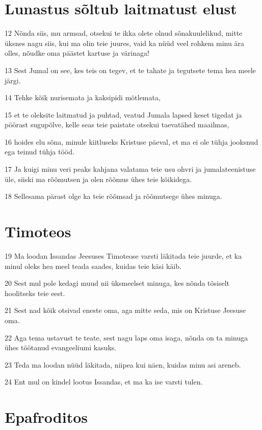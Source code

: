\section*{Lunastus sõltub laitmatust elust}

\par 12 Nõnda siis, mu armsad, otsekui te ikka olete olnud sõnakuulelikud, mitte üksnes nagu siis, kui ma olin teie juures, vaid ka nüüd veel rohkem minu ära olles, nõudke oma päästet kartuse ja värinaga!
\par 13 Sest Jumal on see, kes teis on tegev, et te tahate ja tegutsete tema hea meele järgi.
\par 14 Tehke kõik nurisemata ja kaksipidi mõtlemata,
\par 15 et te oleksite laitmatud ja puhtad, veatud Jumala lapsed keset tigedat ja pöörast sugupõlve, kelle seas teie paistate otsekui taevatähed maailmas,
\par 16 hoides elu sõna, minule kiitluseks Kristuse päeval, et ma ei ole tühja jooksnud ega teinud tühja tööd.
\par 17 Ja kuigi minu veri peaks kahjana valatama teie usu ohvri ja jumalateenistuse üle, siiski ma rõõmutsen ja olen rõõmus ühes teie kõikidega.
\par 18 Sellesama pärast olge ka teie rõõmsad ja rõõmutsege ühes minuga.

\section*{Timoteos}

\par 19 Ma loodan Issandas Jeesuses Timoteose varsti läkitada teie juurde, et ka minul oleks hea meel teada saades, kuidas teie käsi käib.
\par 20 Sest mul pole kedagi muud nii üksmeelset minuga, kes nõnda tõsiselt hoolitseks teie eest.
\par 21 Sest nad kõik otsivad eneste oma, aga mitte seda, mis on Kristuse Jeesuse oma.
\par 22 Aga tema ustavust te teate, sest nagu laps oma isaga, nõnda on ta minuga ühes töötanud evangeeliumi kasuks.
\par 23 Teda ma loodan nüüd läkitada, niipea kui näen, kuidas minu asi areneb.
\par 24 Ent mul on kindel lootus Issandas, et ma ka ise varsti tulen.

\section*{Epafroditos}

